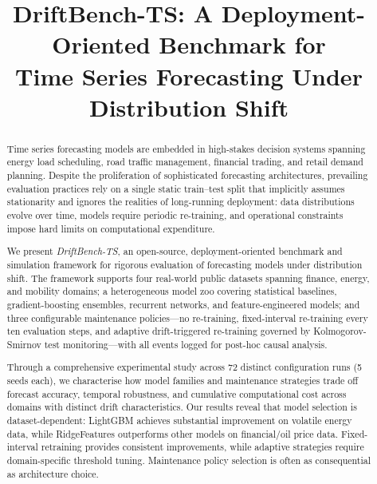 \documentclass[conference]{IEEEtran}
\begin{document}
\title{DriftBench-TS: A Deployment-Oriented Benchmark for\\
	Time Series Forecasting Under Distribution Shift}

\author{
}

\maketitle

\begin{abstract}
	Time series forecasting models are embedded in high-stakes decision
	systems spanning energy load scheduling, road traffic management,
	financial trading, and retail demand planning. Despite the
	proliferation of sophisticated forecasting architectures, prevailing
	evaluation practices rely on a single static train--test split that
	implicitly assumes stationarity and ignores the realities of
	long-running deployment: data distributions evolve over time, models
	require periodic re-training, and operational constraints impose hard
	limits on computational expenditure.

	We present \textit{DriftBench-TS}, an open-source, deployment-oriented
	benchmark and simulation framework for rigorous evaluation of
	forecasting models under distribution shift. The framework supports
	four real-world public datasets spanning finance, energy, and mobility
	domains; a heterogeneous model zoo covering statistical baselines,
	gradient-boosting ensembles, recurrent networks, and feature-engineered
	models; and three configurable maintenance policies---no re-training,
	fixed-interval re-training every ten evaluation steps, and adaptive
	drift-triggered re-training governed by Kolmogorov-Smirnov test
	monitoring---with all events logged for post-hoc causal analysis.

	Through a comprehensive experimental study across 72 distinct
	configuration runs (5 seeds each), we characterise how model families and maintenance
	strategies trade off forecast accuracy, temporal robustness, and
	cumulative computational cost across domains with distinct drift
	characteristics. Our results reveal that model selection is
	dataset-dependent: LightGBM achieves substantial improvement on volatile
	energy data, while RidgeFeatures outperforms other models on
	financial/oil price data. Fixed-interval retraining provides
	consistent improvements, while adaptive strategies require domain-specific
	threshold tuning. Maintenance policy selection is often as consequential
	as architecture choice.
\end{abstract}
\end{document}

